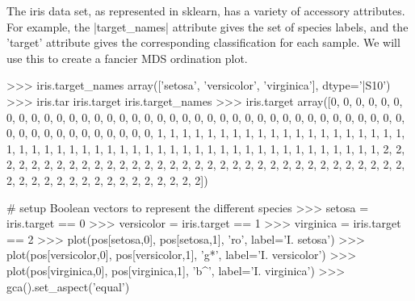 

The iris data set, as represented in sklearn, has a variety of accessory attributes.  For example, the |target_names| attribute gives the set of species labels, and the 'target' attribute gives the corresponding classification for each sample.  We will use this to create a fancier MDS ordination plot.
%
\begin{python}
>>> iris.target_names
array(['setosa', 'versicolor', 'virginica'], 
      dtype='|S10')
>>> iris.tar
iris.target        iris.target_names  
>>> iris.target
array([0, 0, 0, 0, 0, 0, 0, 0, 0, 0, 0, 0, 0, 0, 0, 0, 0, 0, 0, 0, 0, 0, 0,
       0, 0, 0, 0, 0, 0, 0, 0, 0, 0, 0, 0, 0, 0, 0, 0, 0, 0, 0, 0, 0, 0, 0,
       0, 0, 0, 0, 1, 1, 1, 1, 1, 1, 1, 1, 1, 1, 1, 1, 1, 1, 1, 1, 1, 1, 1,
       1, 1, 1, 1, 1, 1, 1, 1, 1, 1, 1, 1, 1, 1, 1, 1, 1, 1, 1, 1, 1, 1, 1,
       1, 1, 1, 1, 1, 1, 1, 1, 2, 2, 2, 2, 2, 2, 2, 2, 2, 2, 2, 2, 2, 2, 2,
       2, 2, 2, 2, 2, 2, 2, 2, 2, 2, 2, 2, 2, 2, 2, 2, 2, 2, 2, 2, 2, 2, 2,
       2, 2, 2, 2, 2, 2, 2, 2, 2, 2, 2, 2])

# setup Boolean vectors to represent the different species
>>> setosa = iris.target == 0
>>> versicolor = iris.target == 1
>>> virginica = iris.target == 2
>>> plot(pos[setosa,0], pos[setosa,1], 'ro', label='I. setosa')
>>> plot(pos[versicolor,0], pos[versicolor,1], 'g*', label='I. versicolor')
>>> plot(pos[virginica,0], pos[virginica,1], 'b^', label='I. virginica')
>>> gca().set_aspect('equal')
\end{python}

